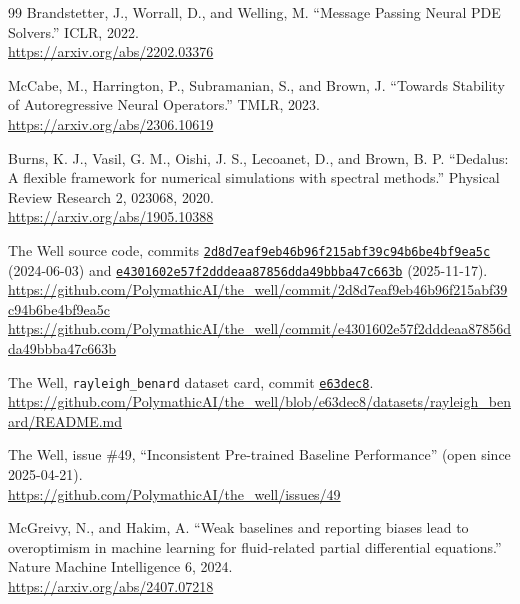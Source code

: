 \documentclass[11pt]{article}
\begin{document}
\begin{thebibliography}{99}
Brandstetter, J., Worrall, D., and Welling, M.
``Message Passing Neural PDE Solvers.''
ICLR, 2022.\\
\url{https://arxiv.org/abs/2202.03376}

McCabe, M., Harrington, P., Subramanian, S., and Brown, J.
``Towards Stability of Autoregressive Neural Operators.''
TMLR, 2023.\\
\url{https://arxiv.org/abs/2306.10619}

Burns, K. J., Vasil, G. M., Oishi, J. S., Lecoanet, D., and Brown, B. P.
``Dedalus: A flexible framework for numerical simulations with spectral methods.''
Physical Review Research 2, 023068, 2020.\\
\url{https://arxiv.org/abs/1905.10388}

The Well source code, commits
\href{https://github.com/PolymathicAI/the_well/commit/2d8d7eaf9eb46b96f215abf39c94b6be4bf9ea5c}{\texttt{2d8d7eaf9eb46b96f215abf39c94b6be4bf9ea5c}}
(2024-06-03) and
\href{https://github.com/PolymathicAI/the_well/commit/e4301602e57f2dddeaa87856dda49bbba47c663b}{\texttt{e4301602e57f2dddeaa87856dda49bbba47c663b}}
(2025-11-17).\\
\url{https://github.com/PolymathicAI/the_well/commit/2d8d7eaf9eb46b96f215abf39c94b6be4bf9ea5c}\\
\url{https://github.com/PolymathicAI/the_well/commit/e4301602e57f2dddeaa87856dda49bbba47c663b}

The Well, \texttt{rayleigh\_benard} dataset card, commit
\href{https://github.com/PolymathicAI/the_well/commit/e63dec8ded515be864755eaf595d39fea409e335}{\texttt{e63dec8}}.\\
\url{https://github.com/PolymathicAI/the_well/blob/e63dec8/datasets/rayleigh_benard/README.md}

The Well, issue \#49, ``Inconsistent Pre-trained Baseline Performance'' (open since 2025-04-21).\\
\url{https://github.com/PolymathicAI/the_well/issues/49}

McGreivy, N., and Hakim, A.
``Weak baselines and reporting biases lead to overoptimism in machine learning for fluid-related partial
differential equations.''
Nature Machine Intelligence 6, 2024.\\
\url{https://arxiv.org/abs/2407.07218}



\end{thebibliography}
\end{document}
